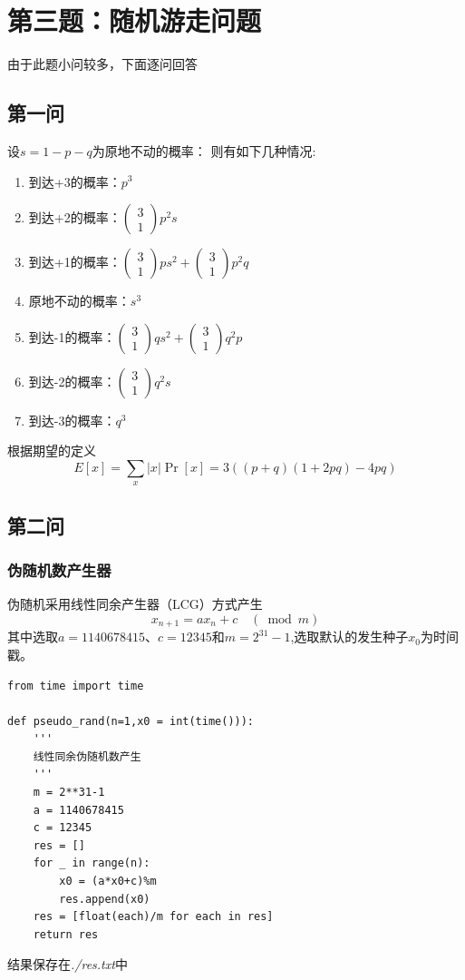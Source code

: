 \documentclass[a4paper]{ctexart}
\begin{document}
\section{第三题：随机游走问题}
由于此题小问较多，下面逐问回答
\subsection{第一问}
设$s=1-p-q$为原地不动的概率：
则有如下几种情况:
\begin{enumerate}
	\item 到达+3的概率：$p^3$
	\item 到达+2的概率：$\left( \begin{array}{l}{3} \\ {1}\end{array}\right) p^{2} s$
	\item 到达+1的概率：$\left( \begin{array}{l}{3} \\ {1}\end{array}\right) p s^{2}+\left( \begin{array}{l}{3} \\ {1}\end{array}\right) p^{2} q$
	\item 原地不动的概率：$s^3$
	\item 到达-1的概率：$\left( \begin{array}{l}{3} \\ {1}\end{array}\right) q s^{2}+\left( \begin{array}{l}{3} \\ {1}\end{array}\right) q^{2} p$
	\item 到达-2的概率：$\left( \begin{array}{l}{3} \\ {1}\end{array}\right) q^{2} s$
	\item 到达-3的概率：$q^3$
\end{enumerate}
根据期望的定义
\begin{equation}
E[x]=\sum_{x}|x| \operatorname{Pr}[x]=3((p+q)(1+2 p q)-4 p q)
\end{equation}
\subsection{第二问}
\subsubsection{伪随机数产生器}
伪随机采用线性同余产生器（LCG）方式产生
\begin{equation}
x_{n+1}=a x_{n}+c \quad(\bmod m)
\end{equation}
其中选取$a=1140678415$、$c=12345$和$m=2^{31}-1$,选取默认的发生种子$x_0$为时间戳。
\begin{lstlisting}
from time import time

def pseudo_rand(n=1,x0 = int(time())):
	'''
	线性同余伪随机数产生
	'''
	m = 2**31-1
	a = 1140678415
	c = 12345
	res = []
	for _ in range(n):
		x0 = (a*x0+c)%m
		res.append(x0)
    res = [float(each)/m for each in res]
	return res
\end{lstlisting}
结果保存在\textit{./res.txt}中
\end{document}
